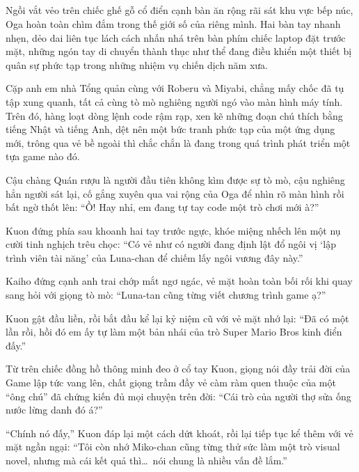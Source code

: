 \documentclass[../main.tex]{subfiles}
\begin{document}
\newpage

\subsection*{\label{ep-M8.V}}
\vspace{-4pt}

Ngồi vắt vẻo trên chiếc ghế gỗ cổ điển cạnh bàn ăn rộng rãi sát khu vực bếp núc, Oga hoàn toàn chìm đắm trong thế giới số của riêng mình. Hai bàn tay nhanh nhẹn, dẻo dai liên tục lách cách nhấn nhá trên bàn phím chiếc laptop đặt trước mặt, những ngón tay di chuyển thành thục như thể đang điều khiển một thiết bị quân sự phức tạp trong những nhiệm vụ chiến dịch năm xưa.


Cặp anh em nhà Tổng quản cùng với Roberu và Miyabi, chẳng mấy chốc đã tụ tập xung quanh, tất cả cùng tò mò nghiêng người ngó vào màn hình máy tính. Trên đó, hàng loạt dòng lệnh code rậm rạp, xen kẽ những đoạn chú thích bằng tiếng Nhật và tiếng Anh, dệt nên một bức tranh phức tạp của một ứng dụng mới, trông qua vẻ bề ngoài thì chắc chắn là đang trong quá trình phát triển một tựa game nào đó.

Cậu chàng Quán rượu là người đầu tiên không kìm được sự tò mò, cậu nghiêng hẳn người sát lại, cố gắng xuyên qua vai rộng của Oga để nhìn rõ màn hình rồi bất ngờ thốt lên: ``Ồ! Hay nhỉ, em đang tự tay code một trò chơi mới à?''

Kuon đứng phía sau khoanh hai tay trước ngực, khóe miệng nhếch lên một nụ cười tinh nghịch trêu chọc: ``Có vẻ như có người đang định lật đổ ngôi vị `lập trình viên tài năng' của Luna-chan để chiếm lấy ngôi vương đây này.''

Kaiho đứng cạnh anh trai chớp mắt ngơ ngác, vẻ mặt hoàn toàn bối rối khi quay sang hỏi với giọng tò mò: ``Luna-tan cũng từng viết chương trình game ạ?''

Kuon gật đầu liền, rồi bắt đầu kể lại kỷ niệm cũ với vẻ mặt nhớ lại: ``Đã có một lần rồi, hồi đó em ấy tự làm một bản nhái của trò Super Mario Bros kinh điển đấy.''

Từ trên chiếc đồng hồ thông minh đeo ở cổ tay Kuon, giọng nói đầy trải đời của Game lập tức vang lên, chất giọng trầm đầy vẻ càm ràm quen thuộc của một ``ông chú'' đã chứng kiến đủ mọi chuyện trên đời: ``Cái trò của người thợ sửa ống nước lừng danh đó á?''

``Chính nó đấy,'' Kuon đáp lại một cách dứt khoát, rồi lại tiếp tục kể thêm với vẻ mặt ngần ngại: ``Tôi còn nhớ Miko-chan cũng từng thử sức làm một trò visual novel, nhưng mà cái kết quả thì\dots\ nói chung là nhiều vấn đề lắm.''
\end{document}
